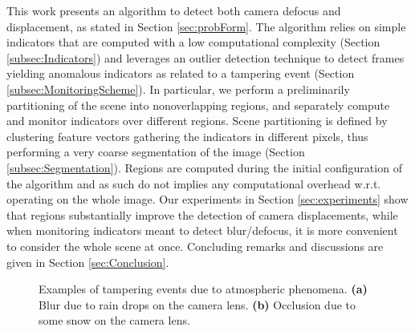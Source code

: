 \documentclass{llncs}
\begin{document}


This work presents an algorithm to detect both camera defocus and displacement, as stated in Section \ref{sec:probForm}. The algorithm relies on simple indicators that are computed with a low computational complexity (Section \ref{subsec:Indicators}) and leverages an outlier detection technique to detect frames yielding anomalous indicators as related to a tampering event (Section \ref{subsec:MonitoringScheme}). In particular, we perform a preliminarily partitioning of the scene into nonoverlapping regions, and separately compute and monitor indicators over different regions. Scene partitioning is defined by clustering feature vectors gathering the indicators in different pixels, thus performing a very coarse segmentation of the image (Section \ref{subsec:Segmentation}). Regions are computed during the initial configuration of the algorithm and as such do not implies any computational overhead w.r.t. operating on the whole image. Our experiments in Section \ref{sec:experiments} show that regions substantially improve the detection of camera displacements, while when monitoring indicators meant to detect blur/defocus, it is more convenient to consider the whole scene at once. Concluding remarks and discussions are given in Section \ref{sec:Conclusion}.


\begin{figure}[t!]
\centering
{}
\caption[Tampering examples]{Examples of tampering events due to atmospheric phenomena. \textbf{(a)} Blur due to rain drops on the camera lens. \textbf{(b)} Occlusion due to some snow on the camera lens.}
\label{fig:tampering}
\end{figure}
\end{document}
